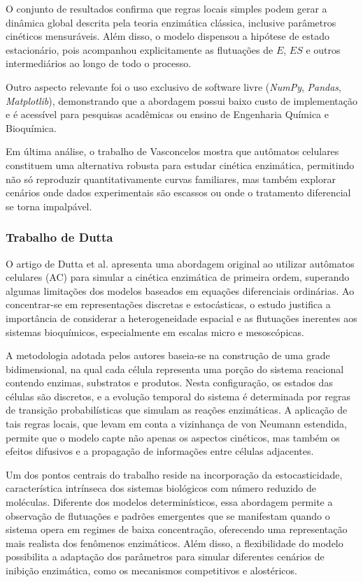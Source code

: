 \documentclass[12pt,oneside]{report}
\begin{document}
O conjunto de resultados confirma que regras locais simples podem gerar a dinâmica global descrita pela teoria enzimática clássica, inclusive parâmetros cinéticos mensuráveis. Além disso, o modelo dispensou a hipótese de estado estacionário, pois acompanhou explicitamente as flutuações de $E$, $ES$ e outros intermediários ao longo de todo o processo.

Outro aspecto relevante foi o uso exclusivo de software livre (\textit{NumPy}, \textit{Pandas}, \textit{Matplotlib}), demonstrando que a abordagem possui baixo custo de implementação e é acessível para pesquisas acadêmicas ou ensino de Engenharia Química e Bioquímica.

Em última análise, o trabalho de Vasconcelos mostra que autômatos celulares constituem uma alternativa robusta para estudar cinética enzimática, permitindo não só reproduzir quantitativamente curvas familiares, mas também explorar cenários onde dados experimentais são escassos ou onde o tratamento diferencial se torna impalpável.

\subsubsection{Trabalho de Dutta}

O artigo de Dutta et al. \cite{dutta2015generalized} apresenta uma abordagem original ao utilizar autômatos celulares (AC) para simular a cinética enzimática de primeira ordem, superando algumas limitações dos modelos baseados em equações diferenciais ordinárias. Ao concentrar-se em representações discretas e estocásticas, o estudo justifica a importância de considerar a heterogeneidade espacial e as flutuações inerentes aos sistemas bioquímicos, especialmente em escalas micro e mesoscópicas.

A metodologia adotada pelos autores baseia-se na construção de uma grade bidimensional, na qual cada célula representa uma porção do sistema reacional contendo enzimas, substratos e produtos. Nesta configuração, os estados das células são discretos, e a evolução temporal do sistema é determinada por regras de transição probabilísticas que simulam as reações enzimáticas. A aplicação de tais regras locais, que levam em conta a vizinhança de von Neumann estendida, permite que o modelo capte não apenas os aspectos cinéticos, mas também os efeitos difusivos e a propagação de informações entre células adjacentes.

Um dos pontos centrais do trabalho reside na incorporação da estocasticidade, característica intrínseca dos sistemas biológicos com número reduzido de moléculas. Diferente dos modelos determinísticos, essa abordagem permite a observação de flutuações e padrões emergentes que se manifestam quando o sistema opera em regimes de baixa concentração, oferecendo uma representação mais realista dos fenômenos enzimáticos. Além disso, a flexibilidade do modelo possibilita a adaptação dos parâmetros para simular diferentes cenários de inibição enzimática, como os mecanismos competitivos e alostéricos.
\end{document}
